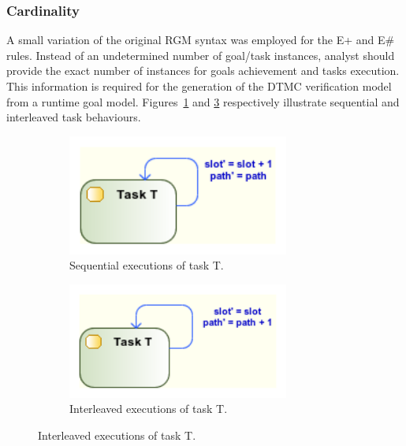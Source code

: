 \subsubsection{Cardinality}

A small variation of the original RGM syntax was employed for the E+ and E\# rules. Instead of an undetermined number of goal/task instances, analyst should provide the exact number of instances for goals achievement and tasks execution. This information is required for the generation of the DTMC verification model from a runtime goal model. Figures~\ref{fig:UML_MUL_SEQ_TSKS} and \ref{fig:UML_MUL_PAR_TSKS} respectively illustrate sequential and interleaved task behaviours.

\begin{figure}[ht!]
        \centering
        \begin{subfigure}[b]{0.4\textwidth}
                \includegraphics[width=0.80\textwidth]{imgs/UML_MUL_SEQ_TSKS.png}
				\caption{Sequential executions of task T.}
				\label{fig:UML_MUL_SEQ_TSKS}
        \end{subfigure}        
        \quad %
        \begin{subfigure}[b]{0.4\textwidth}                
                \includegraphics[width=0.80\textwidth]{imgs/UML_MUL_PAR_TSKS.png}
				\caption{Interleaved executions of task T.}
				\label{fig:UML_MUL_PAR_TSKS}
        \end{subfigure}%
          
\end{figure}

